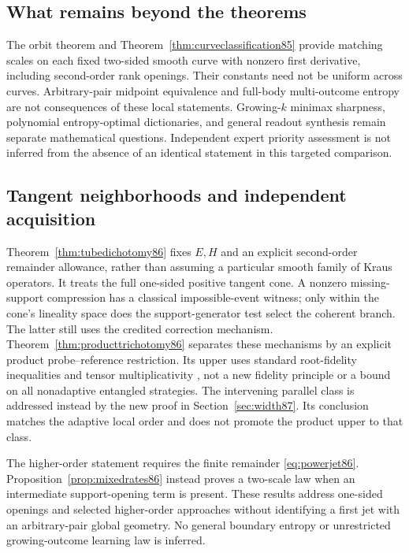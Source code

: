 \subsection{What remains beyond the theorems}
The orbit theorem and Theorem~\ref{thm:curveclassification85} provide
matching scales on each fixed two-sided smooth curve with nonzero
first derivative, including second-order rank openings.  Their
constants need not be uniform across curves.  Arbitrary-pair
midpoint equivalence and full-body multi-outcome entropy are not
consequences of these local statements.  Growing-$k$ minimax sharpness,
polynomial entropy-optimal dictionaries, and general readout synthesis
remain separate mathematical questions.  Independent expert priority
assessment is not inferred from the absence of an identical statement
in this targeted comparison.

\subsection{Tangent neighborhoods and independent acquisition}
Theorem~\ref{thm:tubedichotomy86} fixes $E,H$ and an explicit
second-order remainder allowance, rather than assuming a particular
smooth family of Kraus operators.  It treats the full one-sided
positive tangent cone.  A nonzero missing-support compression has a
classical impossible-event witness; only within the cone's lineality
space does the support-generator test select the coherent branch.
The latter still uses the credited correction mechanism.
Theorem~\ref{thm:producttrichotomy86} separates these mechanisms by
an explicit product probe--reference restriction.  Its upper uses
standard root-fidelity inequalities and tensor multiplicativity
\cite[Chapter~3]{Watrous65}, not a new fidelity principle or a bound
on all nonadaptive entangled strategies.  The intervening parallel
class is addressed instead by the new proof in
Section~\ref{sec:width87}.  Its conclusion matches the adaptive
local order and does not promote the product upper to that class.

The higher-order statement requires the finite remainder
\eqref{eq:powerjet86}.  Proposition~\ref{prop:mixedrates86} instead
proves a two-scale law when an intermediate support-opening term is
present.  These results address one-sided openings and selected
higher-order approaches without identifying a first jet with an
arbitrary-pair global geometry.  No general boundary entropy or
unrestricted growing-outcome learning law is inferred.

